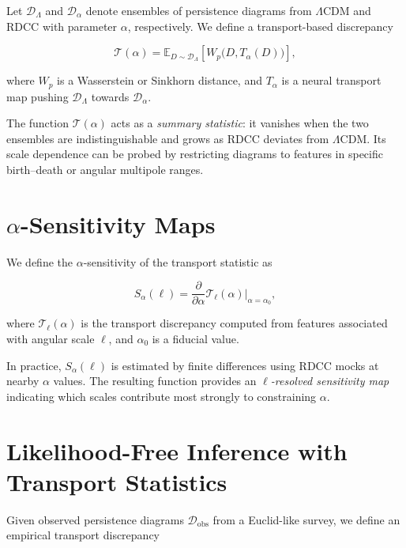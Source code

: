 \documentclass[11pt,a4paper]{article}
\begin{document}
Let $\mathcal{D}_{\Lambda}$ and $\mathcal{D}_{\alpha}$ denote ensembles of 
persistence diagrams from $\Lambda$CDM and RDCC with parameter $\alpha$, 
respectively. We define a transport-based discrepancy

\begin{equation}
    \mathcal{T}(\alpha)
    =
    \mathbb{E}_{D \sim \mathcal{D}_{\Lambda}}
    \left[
        W_{p}\bigl(D, T_{\alpha}(D)\bigr)
    \right],
\end{equation}

where $W_{p}$ is a Wasserstein or Sinkhorn distance, and $T_{\alpha}$ is a neural 
transport map pushing $\mathcal{D}_{\Lambda}$ towards $\mathcal{D}_{\alpha}$.

The function $\mathcal{T}(\alpha)$ acts as a \emph{summary statistic}: it 
vanishes when the two ensembles are indistinguishable and grows as RDCC deviates 
from $\Lambda$CDM. Its scale dependence can be probed by restricting diagrams to 
features in specific birth--death or angular multipole ranges.
\section{\texorpdfstring{$\alpha$}{alpha}-Sensitivity Maps}

We define the $\alpha$-sensitivity of the transport statistic as

\begin{equation}
    S_{\alpha}(\ell)
    =
    \frac{\partial}{\partial \alpha}
    \mathcal{T}_{\ell}(\alpha)
    \bigg|_{\alpha = \alpha_{0}},
\end{equation}

where $\mathcal{T}_{\ell}(\alpha)$ is the transport discrepancy computed from 
features associated with angular scale $\ell$, and $\alpha_{0}$ is a fiducial 
value.

In practice, $S_{\alpha}(\ell)$ is estimated by finite differences using RDCC 
mocks at nearby $\alpha$ values. The resulting function provides an 
\emph{$\ell$-resolved sensitivity map} indicating which scales contribute most 
strongly to constraining $\alpha$.
\section{Likelihood-Free Inference with Transport Statistics}

Given observed persistence diagrams $\mathcal{D}_{\mathrm{obs}}$ from a 
Euclid-like survey, we define an empirical transport discrepancy
\end{document}
